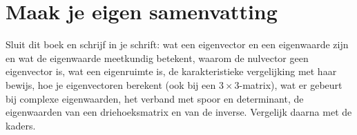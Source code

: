 
\begin{oefeningen}






\end{oefeningen}


\ifzelfstudie
\section*{Maak je eigen samenvatting}
Sluit dit boek en schrijf in je schrift: wat een eigenvector en een eigenwaarde zijn en wat de eigenwaarde meetkundig betekent, waarom de nulvector geen eigenvector is, wat een eigenruimte is, de karakteristieke vergelijking met haar bewijs, hoe je eigenvectoren berekent (ook bij een $3 \times 3$-matrix), wat er gebeurt bij complexe eigenwaarden, het verband met spoor en determinant, de eigenwaarden van een driehoeksmatrix en van de inverse. Vergelijk daarna met de kaders.
\fi
